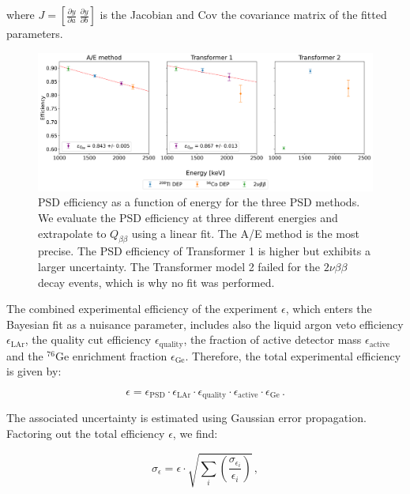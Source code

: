 \noindent where $J = \left[ \frac{\partial y}{\partial a} \; \frac{\partial y}{\partial b}\right]$ is the Jacobian and $\mathrm{Cov}$ the covariance matrix of the fitted parameters. 


\begin{figure}
    \centering
    \includegraphics[width=\linewidth]{figures/05_PSD/PSD_eff_qbb.png}
    \caption{PSD efficiency as a function of energy for the three PSD methods. We evaluate the PSD efficiency at three different energies and extrapolate to $Q_{\beta \beta}$ using a linear fit. The A/E method is the most precise. The PSD efficiency of Transformer 1 is higher but exhibits a larger uncertainty. The Transformer model 2 failed for the $2 \nu \beta \beta$ decay events, which is why no fit was performed.}
\label{fig:psd_eff_qbb}
\end{figure}


The combined experimental efficiency of the experiment $\epsilon$, which enters the Bayesian fit as a nuisance parameter, includes also the liquid argon veto efficiency $\epsilon_{\mathrm{LAr}}$, the quality cut efficiency $\epsilon_{\mathrm{quality}}$, the fraction of active detector mass $\epsilon_{\mathrm{active}}$ and the $^{76}$Ge enrichment fraction $\epsilon_{\mathrm{Ge}}$. 
Therefore, the total experimental efficiency is given by:

\begin{equation}
\label{eq:total_efficiency}
	\epsilon = \epsilon_{\mathrm{PSD}} \cdot \epsilon_{\mathrm{LAr}} \cdot \epsilon_{\mathrm{quality}} \cdot \epsilon_{\mathrm{active}} \cdot \epsilon_{\mathrm{Ge}} \, .
\end{equation}

The associated uncertainty is estimated using Gaussian error propagation. Factoring out the total efficiency $\epsilon$, we find:  

\begin{equation}
\label{eq:total_efficiency_unc}
	\sigma_{\epsilon} = \epsilon \cdot \sqrt{ \sum_i \left( \frac{\sigma_{\epsilon_i}}{\epsilon_i} \right) } \, ,
\end{equation}

